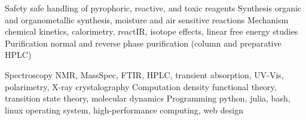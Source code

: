 

\begin{cvskills}
  \cvskill
  {Safety} %
  {safe handling of pyrophoric, reactive, and toxic reagents} %
  \cvskill
  {Synthesis} %
  {organic and organometallic synthesis, moisture and air sensitive reactions} %
  \cvskill
  {Mechanism} %
  {chemical kinetics, calorimetry, reactIR, isotope effects, linear free energy studies} %
  \cvskill
  {Purification} %
  {normal and reverse phase purification (column and preparative HPLC) } %

  \cvskill
  {Spectroscopy} %
  {NMR, MassSpec, FTIR, HPLC, transient absorption, UV-Vis, polarimetry, X-ray crystalography} %
  \cvskill
  {Computation} %
  {density functional theory, transition state theory, molecular dynamics} %
  \cvskill
  {Programming} %
  {python, julia, bash, linux operating system, high-performance computing, web design} %

\end{cvskills}
